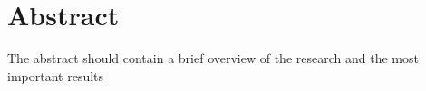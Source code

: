 \chapter*{Abstract}

The abstract should contain a brief overview of the research and the most important results